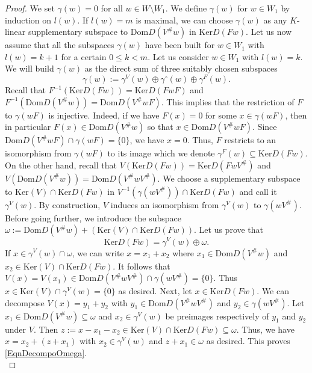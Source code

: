 \documentclass[12pt]{amsart}
\theoremstyle{definition}
\newcommand{\<}{\langle}   %
\renewcommand{\>}{\rangle} %
\begin{document}
\begin{proof}
We set $\gamma(w) = 0$ for all $w\in W \setminus W_1$. We define $\gamma(w)$ for $w \in W_1$ by induction on $l(w)$. If $l(w) = m$ is maximal, we can choose $\gamma(w)$ as any $K$-linear supplementary subspace to $\mathrm{Dom}D(V^{\#}w)$ in $\mathrm{Ker}D(Fw)$. Let us now assume that all the subspaces $\gamma(w)$ have been built for $w \in W_1$ with $l(w) = k+1$ for a certain $0 \leq k < m$. Let us consider $w \in W_1$ with $l(w) = k$. We will build $\gamma(w)$ as the direct sum of three suitably chosen subspaces 
\begin{equation*}
    \gamma(w) := \gamma^V(w) \oplus \gamma^{\circ}(w) \oplus \gamma^F(w).
\end{equation*}
Recall that $F^{-1}(\mathrm{Ker} D(Fw)) = \mathrm{Ker}D(FwF)$ and $F^{-1}(\mathrm{Dom} D(V^{\#}w)) = \mathrm{Dom} D(V^{\#}wF)$. This implies that the restriction of $F$ to $\gamma(wF)$ is injective. Indeed, if we have $F(x) = 0$ for some $x \in \gamma(wF)$, then in particular $F(x) \in \mathrm{Dom} D(V^{\#}w)$ so that $x \in \mathrm{Dom} D(V^{\#}wF)$. Since $\mathrm{Dom} D(V^{\#}wF) \cap \gamma(wF) = \{0\}$, we have $x = 0$. Thus, $F$ restricts to an isomorphism from $\gamma(wF)$ to its image which we denote $\gamma^F(w) \subseteq  \mathrm{Ker}D(Fw)$. On the other hand, recall that $V(\mathrm{Ker} D(Fw)) = \mathrm{Ker}D(FwV^{\#})$ and $V(\mathrm{Dom}D(V^{\#}w)) = \mathrm{Dom}D(V^{\#}wV^{\#})$. We choose a supplementary subspace to $\mathrm{Ker}(V) \cap \mathrm{Ker} D(Fw)$ in $V^{-1}(\gamma(wV^{\#})) \cap \mathrm{Ker} D(Fw)$ and call it $\gamma^V(w)$. By construction, $V$ induces an isomorphism from $\gamma^V(w)$ to $\gamma(wV^{\#})$.\\
Before going further, we introduce the subspace $\omega := \mathrm{Dom}D(V^{\#}w) + (\mathrm{Ker}(V) \cap \mathrm{Ker} D(Fw))$. Let us prove that
\begin{equation}\label{EqnDecompoOmega}
    \mathrm{Ker} D(Fw) = \gamma^V(w) \oplus \omega.
\end{equation} 
If $x \in \gamma^V(w) \cap \omega$, we can write $x = x_1 + x_2$ where $x_1 \in \mathrm{Dom}D(V^{\#}w)$ and $x_2 \in \mathrm{Ker}(V) \cap \mathrm{Ker} D(Fw)$. It follows that $V(x) = V(x_1) \in \mathrm{Dom}D(V^{\#}wV^{\#}) \cap \gamma(wV^{\#}) = \{0\}$. Thus $x \in \mathrm{Ker}(V) \cap \gamma^V(w) = \{0\}$ as desired. Next, let $x\in \mathrm{Ker} D(Fw)$. We can decompose $V(x) = y_1 + y_2$ with $y_1 \in \mathrm{Dom}D(V^{\#}wV^{\#})$ and $y_2 \in \gamma(wV^{\#})$. Let $x_1 \in \mathrm{Dom} D(V^{\#}w) \subseteq  \omega$ and $x_2 \in \gamma^V(w)$ be preimages respectively of $y_1$ and $y_2$ under $V$. Then $z := x - x_1 - x_2 \in \mathrm{Ker}(V) \cap \mathrm{Ker} D(Fw) \subseteq  \omega$. Thus, we have $x = x_2 + (z + x_1)$ with $x_2 \in \gamma^V(w)$ and $z+x_1 \in \omega$ as desired. This proves \eqref{EqnDecompoOmega}.\\

\end{proof}
\end{document}
